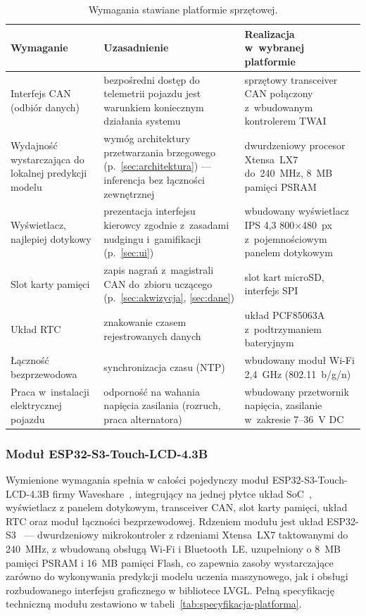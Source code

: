 \begin{table}[!h]
    \centering
    \caption{Wymagania stawiane platformie sprzętowej.}
    \label{tab:wymagania-platforma}
    \begin{tabular}{| p{3.5cm} | p{5.3cm} | p{4.9cm} |} \hline
        \textbf{Wymaganie} & \textbf{Uzasadnienie} & \textbf{Realizacja w~wybranej platformie} \\ \hline\hline
        Interfejs CAN (odbiór danych) & bezpośredni dostęp do telemetrii pojazdu jest warunkiem koniecznym działania systemu & sprzętowy transceiver CAN połączony z~wbudowanym kontrolerem TWAI \\ \hline
        Wydajność wystarczająca do lokalnej predykcji modelu & wymóg architektury przetwarzania brzegowego (p.~\ref{sec:architektura}) --- inferencja bez łączności zewnętrznej & dwurdzeniowy procesor Xtensa~LX7 do~240~MHz, 8~MB pamięci PSRAM \\ \hline
        Wyświetlacz, najlepiej dotykowy & prezentacja interfejsu kierowcy zgodnie z~zasadami nudgingu i~gamifikacji (p.~\ref{sec:ui}) & wbudowany wyświetlacz IPS 4,3\textquotedbl{} 800$\times$480~px z~pojemnościowym panelem dotykowym \\ \hline
        Slot karty pamięci & zapis nagrań z~magistrali CAN do~zbioru uczącego (p.~\ref{sec:akwizycja}, \ref{sec:dane}) & slot kart microSD, interfejs SPI \\ \hline
        Układ RTC & znakowanie czasem rejestrowanych danych & układ PCF85063A z~podtrzymaniem bateryjnym \\ \hline
        Łączność bezprzewodowa & synchronizacja czasu (NTP) & wbudowany moduł Wi-Fi 2,4~GHz (802.11~b/g/n) \\ \hline
        Praca w~instalacji elektrycznej pojazdu & odporność na wahania napięcia zasilania (rozruch, praca alternatora) & wbudowany przetwornik napięcia, zasilanie w~zakresie 7--36~V DC \\ \hline
    \end{tabular}
\end{table}

\subsubsection{Moduł ESP32-S3-Touch-LCD-4.3B}

Wymienione wymagania spełnia w całości pojedynczy moduł
ESP32-S3-Touch-LCD-4.3B firmy Waveshare~\cite{waveshare2024}, integrujący na
jednej płytce układ SoC~\cite{wikisoc}, wyświetlacz z panelem dotykowym, transceiver CAN,
slot karty pamięci, układ RTC oraz moduł łączności bezprzewodowej.
Rdzeniem modułu jest układ ESP32-S3~\cite{espressif_s3_ds} ---
dwurdzeniowy mikrokontroler z rdzeniami Xtensa~LX7 taktowanymi do 240~MHz,
z wbudowaną obsługą Wi-Fi i Bluetooth~LE, uzupełniony o 8~MB pamięci PSRAM
i 16~MB pamięci Flash, co zapewnia zasoby wystarczające zarówno do
wykonywania predykcji modelu uczenia maszynowego, jak i obsługi
rozbudowanego interfejsu graficznego w bibliotece LVGL. Pełną specyfikację
techniczną modułu zestawiono w tabeli~\ref{tab:specyfikacja-platforma}.

